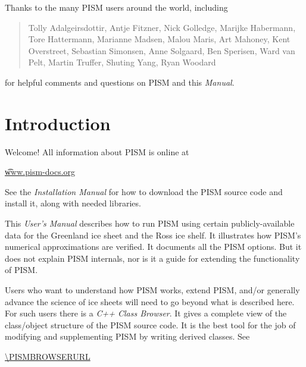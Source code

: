 \documentclass[titlepage,letterpaper,final]{scrartcl}
\begin{document}
Thanks to the many PISM users around the world, including

\begin{quote}
Tolly Adalgeirsdottir, Antje Fitzner, Nick Golledge, Marijke Habermann, Tore Hattermann, Marianne Madsen, Malou Maris, Art Mahoney, Kent Overstreet, Sebastian Simonsen, Anne Solgaard, Ben Sperisen, Ward van Pelt, Martin Truffer, Shuting Yang, Ryan Woodard
\end{quote}

\noindent for helpful comments and questions on PISM and this \emph{Manual}.
\normalsize



\newpage
\setcounter{tocdepth}{3}
\small
\tableofcontents
\normalsize

\newpage


\section{Introduction}\label{sect:intro}

Welcome!  All information about PISM is online at
\begin{center}
  \href{http://www.pism-docs.org}{\t{www.pism-docs.org}}
\end{center}

See the \emph{Installation Manual} for how to download the PISM source code and install it, along with needed libraries.

This \emph{User's Manual} describes how to run PISM using certain publicly-available data for the Greenland ice sheet and the Ross ice shelf.  It illustrates how PISM's numerical approximations are verified.  It documents all the PISM options.  But it does not explain PISM internals, nor is it a guide for extending the functionality of PISM.

Users who want to understand how PISM works, extend PISM, and/or generally advance the science of ice sheets will need to go beyond what is described here.  For such users there is a \emph{C++ Class Browser}.  It gives a complete view of the class/object structure of the PISM source code.  It is the best tool for the job of modifying and supplementing PISM by writing derived classes.  See
\begin{center}
  \url{\PISMBROWSERURL}
\end{center}

\vspace{.4in}
  
\end{document}
